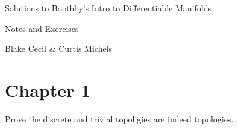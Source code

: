 \documentclass[11pt]{exam}
\begin{document}
 
	
	\vspace*{20mm}
	
	\begin{center}
		\Huge{Solutions to Boothby's Intro to Differentiable Manifolds}\\
		
		\vspace{10mm}
		
		\Huge{Notes and Exercises}\\
		
		\vspace{10mm}
		
		\huge{Blake Cecil \& Curtis Michels}
		
	\end{center}
	
	
	\newpage 
	
	\tableofcontents
	
	\newpage
	
	\section{Chapter 1}
	
	\begin{questions}
		\question Prove the discrete and trivial topoligies are indeed topologies.
	\end{questions}
	
	
\end{document}
